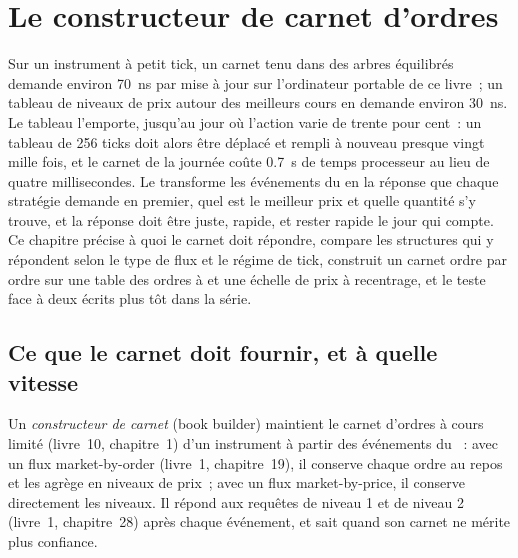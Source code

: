 \chapter{Le constructeur de carnet d'ordres}\label{ch:ll:the-order-book-builder}

Sur un instrument à petit tick, un carnet tenu dans des arbres équilibrés demande environ \qty{70}{\nano\second} par mise à jour sur
l'ordinateur portable de ce livre~; un tableau de niveaux de prix autour des meilleurs cours en demande environ \qty{30}{\nano\second}. Le tableau l'emporte, jusqu'au jour où
l'action varie de trente pour cent~: un tableau de 256 ticks doit alors être déplacé et rempli à nouveau presque vingt mille fois, et le
carnet de la journée coûte \qty{0.7}{\second} de temps processeur au lieu de quatre millisecondes. Le  transforme les événements du  en la réponse que chaque stratégie demande en premier, quel est le meilleur prix et quelle quantité s'y trouve, et la réponse
doit être juste, rapide, et rester rapide le jour qui compte. Ce chapitre précise à quoi le carnet doit répondre, compare les
structures qui y répondent selon le type de flux et le régime de tick, construit un carnet ordre par ordre sur une table des ordres à  et une
échelle de prix à recentrage, et le teste face à deux  écrits plus tôt dans la série.

\section{Ce que le carnet doit fournir, et à quelle vitesse}

\begin{definition}\label{def:ll:the-order-book-builder:builder}
Un \emph{constructeur de carnet} (book builder) maintient le carnet d'ordres à cours limité (livre~10, chapitre~1) d'un instrument à partir des
événements du ~: avec un flux market-by-order (livre~1, chapitre~19), il conserve chaque ordre au repos et les
agrège en niveaux de prix~; avec un flux market-by-price, il conserve directement les niveaux. Il répond aux requêtes de niveau 1 et de niveau 2
(livre~1, chapitre~28) après chaque événement, et sait quand son carnet ne mérite plus confiance.
\end{definition}

